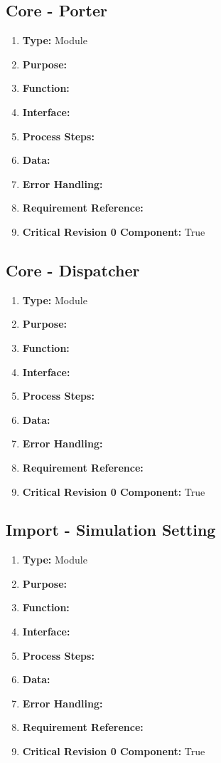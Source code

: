 \documentclass[paper=letter, fontsize=10pt]{scrartcl}
\numberwithin{equation}{section}		%
\numberwithin{figure}{section}			%
\numberwithin{table}{section}				%
\begin{document}
\subsection{Core - Porter}
\begin{enumerate}[]
	\item \textbf{Type:} Module
	\item \textbf{Purpose:} 
	\item \textbf{Function:} 
	\item \textbf{Interface:}
	\item \textbf{Process Steps:} 
	\item \textbf{Data:}
	\item \textbf{Error Handling:}
	\item \textbf{Requirement Reference:}
	\item \textbf{Critical Revision 0 Component:} True
\end{enumerate}
\subsection{Core - Dispatcher}
\begin{enumerate}[]
	\item \textbf{Type:} Module
	\item \textbf{Purpose:} 
	\item \textbf{Function:} 
	\item \textbf{Interface:}
	\item \textbf{Process Steps:} 
	\item \textbf{Data:}
	\item \textbf{Error Handling:}
	\item \textbf{Requirement Reference:}
	\item \textbf{Critical Revision 0 Component:} True
\end{enumerate}
\subsection{Import - Simulation Setting}
\begin{enumerate}[]
	\item \textbf{Type:} Module
	\item \textbf{Purpose:} 
	\item \textbf{Function:} 
	\item \textbf{Interface:}
	\item \textbf{Process Steps:} 
	\item \textbf{Data:}
	\item \textbf{Error Handling:}
	\item \textbf{Requirement Reference:}
	\item \textbf{Critical Revision 0 Component:} True
\end{enumerate}
\end{document}
